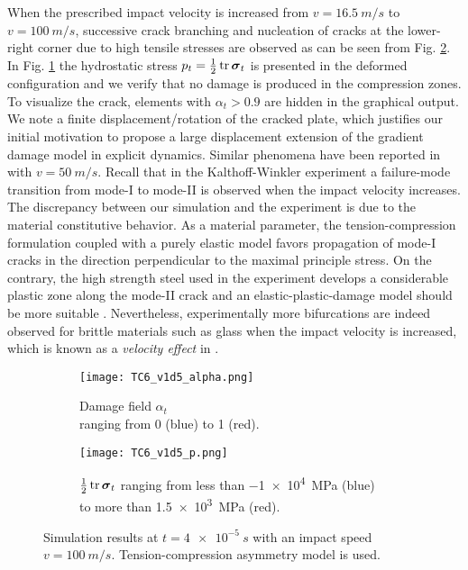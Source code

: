 When the prescribed impact velocity is increased from $v=\SI{16.5}{m/s}$ to $v=\SI{100}{m/s}$, successive crack branching and nucleation of cracks at the lower-right corner due to high tensile stresses are observed as can be seen from Fig. \ref{fig:v1d5}. In Fig. \ref{fig:v1d5_p} the hydrostatic stress $p_t=\frac{1}{2}\tr\sig_t$ is presented in the deformed configuration and we verify that no damage is produced in the compression zones. To visualize the crack, elements with $\alpha_t>0.9$ are hidden in the graphical output. We note a finite displacement/rotation of the cracked plate, which justifies our initial motivation to propose a large displacement extension of the gradient damage model in explicit dynamics. Similar phenomena have been reported in \cite{HofackerMiehe:2012} with $v=\SI{50}{m/s}$. Recall that in the Kalthoff-Winkler experiment a failure-mode transition from mode-\RN{1} to mode-\RN{2} is observed when the impact velocity increases. The discrepancy between our simulation and the experiment is due to the material constitutive behavior. As a material parameter, the tension-compression formulation \cite{FreddiRoyer-Carfagni:2010} coupled with a purely elastic model favors propagation of mode-\RN{1} cracks in the direction perpendicular to the maximal principle stress. On the contrary, the high strength steel used in the experiment develops a considerable plastic zone along the mode-\RN{2} crack and an elastic-plastic-damage model should be more suitable \cite{MieheHofackerSchaenzelAldakheel:2015}. Nevertheless, experimentally more bifurcations are indeed observed for brittle materials such as glass when the impact velocity is increased, which is known as a \emph{velocity effect} in \cite{Schardin:2012}.
\begin{figure}[htbp]
\centering
\begin{subfigure}[b]{0.48\textwidth}
\centering
\texttt{[image: TC6\_v1d5\_alpha.png]}
\caption{Damage field $\alpha_t$ \\ ranging from 0 (blue) to 1 (red).}
\end{subfigure}
\begin{subfigure}[b]{0.48\textwidth}
\centering
\texttt{[image: TC6\_v1d5\_p.png]}
\caption{$\frac{1}{2}\tr\sig_t$ ranging from less than \SI{-1e4}{MPa} (blue) to more than \SI{1.5e3}{MPa} (red).} \label{fig:v1d5_p}
\end{subfigure}
\caption{Simulation results at $t=\SI{4e-5}{s}$ with an impact speed $v=\SI{100}{m/s}$. Tension-compression asymmetry model \cite{FreddiRoyer-Carfagni:2010} is used.} \label{fig:v1d5}
\end{figure}

